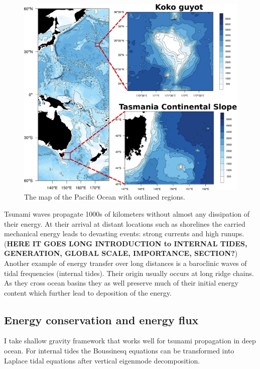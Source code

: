 \begin{figure}
\includegraphics[scale=0.5]{../figures/map_w_places.pdf}
\caption{The map of the Pacific Ocean with outlined regions.}
\end{figure}

Tsunami waves propagate 1000s of kilometers without almost any dissipation of their energy. At their arrival at distant locations such as shorelines the carried mechanical energy leads to devasting events: strong currents and high runups.\\
(\textbf{HERE IT GOES LONG INTRODUCTION to INTERNAL TIDES, GENERATION, GLOBAL SCALE, IMPORTANCE, SECTION?})\\
Another example of energy transfer over long distances is a baroclinic waves of tidal frequencies (internal tides). Their origin usually occurs at long ridge chains. As they cross ocean basins they as well preserve much of their initial energy content which further lead to deposition of the energy.\\

\subsection{Energy conservation and energy flux}
I take shallow gravity framework that works well for tsunami propagation in deep ocean. For internal tides the Boussinesq equations can be transformed into Laplace tidal equations after vertical eigenmode decomposition.\\

